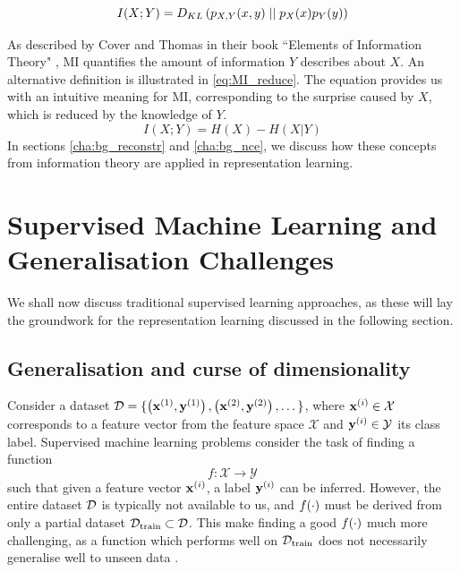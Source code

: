 \begin{equation}
	I(X; Y) =  D_{KL} \left( p_{X, Y}(x, y) \mid \mid p_X(x) p_Y(y) \right)
\end{equation}

As described by Cover and Thomas in their book ``Elements of Information Theory" \citep{coverElementsInformationTheory2006}, MI quantifies the amount of information $Y$ describes about $X$. An alternative definition is illustrated in \ref{eq:MI_reduce}. The equation provides us with an intuitive meaning for MI, corresponding to the surprise caused by $X$, which is reduced by the knowledge of $Y$. 
\begin{equation}
	I(X;Y)= H(X) - H(X|Y) \label{eq:MI_reduce}
\end{equation}
In sections \ref{cha:bg_reconstr} and \ref{cha:bg_nce}, we discuss how these concepts from information theory are applied in representation learning.



\section{Supervised Machine Learning and Generalisation Challenges}




We shall now discuss traditional supervised learning approaches, as these will lay the groundwork for the representation learning discussed in the following section. 

\subsection{Generalisation and curse of dimensionality}
	Consider a dataset $\mathcal{D} = \{ \left( \mathbf{x}^{(1)}, \mathbf{y}^{(1)} \right), \left( \mathbf{x}^{(2)}, \mathbf{y}^{(2)} \right), \dots \}$, where $\mathbf{x}^{(i)} \in \mathcal{X}$ corresponds to a feature vector from the feature space $\mathcal{X}$ and $\mathbf{y}^{(i)} \in \mathcal{Y}$ its class label. Supervised machine learning problems consider the task of finding a function
	$$f: \mathcal{X} \rightarrow \mathcal{Y} \label{eq:fxy} $$
	such that given a feature vector $\mathbf{x}^{(i)}$, a label $\mathbf{y}^{(i)}$ can be inferred. However, the entire dataset $\mathcal{D}$ is typically not available to us, and $f(\cdot)$ must be derived from only a partial dataset $\mathcal{D}_{\text{train}} \subset \mathcal{D}$. This make finding a good $f(\cdot)$ much more challenging, as a function which performs well on $\mathcal{D}_{\text{train}} $ does not necessarily generalise well to unseen data  \citep{neyshaburExploringGeneralizationDeep2017, chungUnknownExamplesMachine2019, barbieroModelingGeneralizationMachine2020}.

